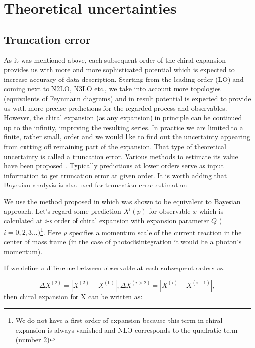 \section{Theoretical uncertainties}

    
    \subsection*{Truncation error}
    \label{sec:trunc}

    As it was mentioned above, each subsequent order of the chiral
    expansion provides us with more and more sophisticated
    potential which is expected to increase accuracy of data description.
    Starting from the leading order (LO) and coming next to
    N2LO, N3LO etc., we take into account more topologies (equivalents of Feynmann diagrams) 
    and in result potential is expected to provide us with more precise predictions
    for the regarded process and observables. However, the chiral expansion (as any expansion) 
    in principle can be continued up to the infinity, improving the resulting series.
    In practice we are limited to a finite, rather small, order 
    and we would like to find out
    the uncertainty appearing from cutting off remaining part of the expansion.
    That type of theoretical uncertainty is called a truncation error. 
    Various methods to estimate its value
    have been proposed \cite{epelkrebs2015, Epelbaum2015_trunc, Binder2015, Epelbaum_pos, Miller_arxiv}.
    Typically predictions at lower orders serve as input information to get truncation error at given order.
    It is worth adding that Bayesian analysis is also used for truncation error estimation

    We use the method proposed in \cite{Binder2015} which was shown to be equivalent to Bayesian approach.
    Let's regard some prediction $X^i(p)$ for observable $x$ which is calculated at $i$-s order of chiral expansion 
    with expansion parameter $Q$ ($i = 0,2,3...)$\footnote{We do not have a first order of expansion
    because this term in chiral expansion is always vanished
    and NLO  corresponds to the quadratic term (number 2)}.
    Here $p$ specifies a momentum
    scale of the current reaction in the center of mass frame (in the case of photodisintegration it would be a
    photon's momentum).  

    If we define a difference between observable at each subsequent orders as:

    \begin{equation}
        \Delta X^{(2)} = |X^{(2)} - X^{(0)}|, \Delta X^{(i>2)} = |X^{(i)} - X^{(i-1)}|,
    \end{equation}
    then chiral expansion for X can be written as:

